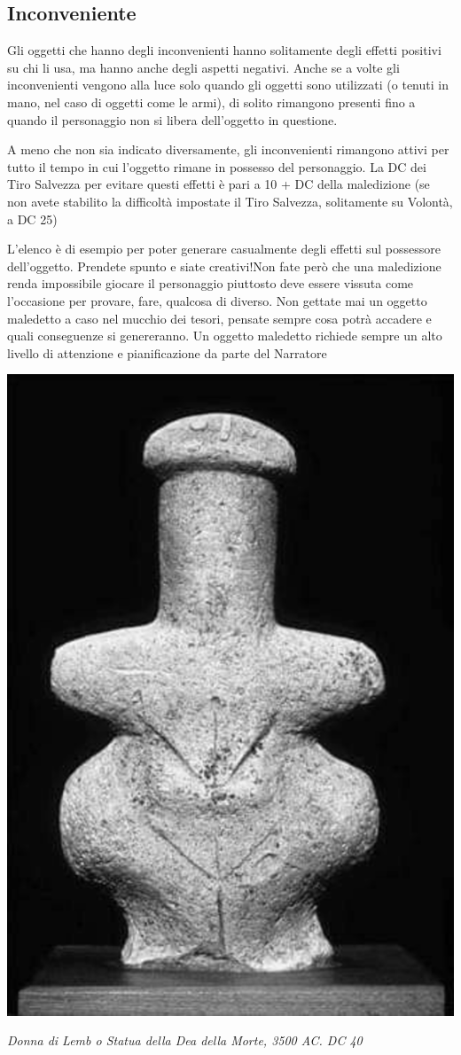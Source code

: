 \begin{multicols}{2}
\subsection{Inconveniente}

Gli oggetti che hanno degli inconvenienti hanno solitamente degli effetti positivi su chi li usa, ma hanno anche degli aspetti negativi. Anche se a volte gli inconvenienti vengono alla luce solo quando gli oggetti sono utilizzati (o tenuti in mano, nel caso di oggetti come le armi), di solito rimangono presenti fino a quando il personaggio non si libera dell'oggetto in questione.

A meno che non sia indicato diversamente, gli inconvenienti rimangono attivi per tutto il tempo in cui l'oggetto rimane in possesso del personaggio. La DC dei Tiro Salvezza per evitare questi effetti è pari a 10 + DC della maledizione (se non avete stabilito la difficoltà impostate il Tiro Salvezza, solitamente su Volontà, a DC 25)

\medskip

\begin{changemargin}{0.3cm}{0.3cm}\begin{narratore}L'elenco è di esempio per poter generare casualmente degli effetti sul possessore dell'oggetto. Prendete spunto e siate creativi!Non fate però che una maledizione renda impossibile giocare il personaggio piuttosto deve essere vissuta come l'occasione per provare, fare, qualcosa di diverso. Non gettate mai un oggetto maledetto a caso nel mucchio dei tesori, pensate sempre cosa potrà accadere e quali conseguenze si genereranno. Un oggetto maledetto richiede sempre un alto livello di attenzione e pianificazione da parte del Narratore\end{narratore}\end{changemargin}

\medskip

\end{multicols}

\vfill

\begin{center}
\includegraphics[width=0.35\linewidth]{immagini/donnalemb.png}

\emph{Donna di Lemb o Statua della Dea della Morte, 3500 AC. DC 40}
\end{center}

